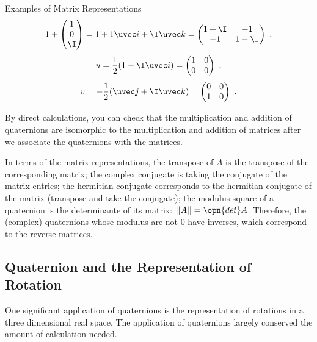 \begin{example}{Examples of Matrix Representations}\label{ex_QuaRot_1}
\begin{equation}
1+\begin{pmatrix}1\\0\\\I\end{pmatrix} =1+1\uvec i+\I\uvec k =\begin{pmatrix}1+\I&-1\\-1&1-\I\end{pmatrix} ~,
\end{equation}
\begin{equation}
u=\frac{1}{2}(1-\I\uvec i)=\begin{pmatrix}1&0\\0&0\end{pmatrix} ~,
\end{equation}
\begin{equation}
v=-\frac{1}{2}(\uvec j+\I\uvec k)=\begin{pmatrix}0&0\\1&0\end{pmatrix} ~.
\end{equation}
\end{example}

By direct calculations, you can check that the multiplication and addition of quaternions are isomorphic to the multiplication and addition of matrices after we associate the quaternions with the matrices.  

In terms of the matrix representations, the transpose of $A$ is the transpose of the corresponding matrix; the complex conjugate is taking the conjugate of the matrix entries; the hermitian conjugate corresponds to the hermitian conjugate of the matrix (transpose and take the conjugate); the modulus square of a quaternion is the determinante of its matrix: $||A||=\opn{det}A$. Therefore, the (complex) quaternions whose modulus are not $0$ have inverses, which correspond to the reverse matrices. 


\subsection{Quaternion and the Representation of Rotation}

One significant application of quaternions is the representation of rotations in a three dimensional real space. The application of quaternions largely conserved the amount of calculation needed. 

